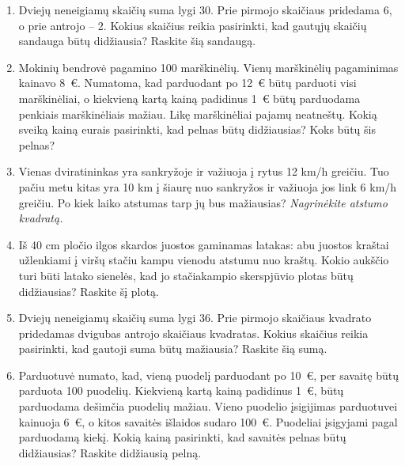 \documentclass[11pt,a4paper]{article}
\begin{document}
\begin{enumerate}[start=3]
\item \begin{minipage}[t]{\linewidth}Dviejų neneigiamų skaičių suma lygi 30. Prie pirmojo skaičiaus pridedama 6, o prie antrojo -- 2. Kokius skaičius reikia pasirinkti, kad gautųjų skaičių sandauga būtų didžiausia? Raskite šią sandaugą.\end{minipage}
\item \begin{minipage}[t]{\linewidth}Mokinių bendrovė pagamino 100 marškinėlių. Vienų marškinėlių pagaminimas kainavo 8~€. Numatoma, kad parduodant po 12~€ būtų parduoti visi marškinėliai, o kiekvieną kartą kainą padidinus 1~€ būtų parduodama penkiais marškinėliais mažiau. Likę marškinėliai pajamų neatneštų. Kokią sveiką kainą eurais pasirinkti, kad pelnas būtų didžiausias? Koks būtų šis pelnas?\end{minipage}
\item \begin{minipage}[t]{\linewidth}Vienas dviratininkas yra sankryžoje ir važiuoja į rytus 12 km/h greičiu. Tuo pačiu metu kitas yra 10 km į šiaurę nuo sankryžos ir važiuoja jos link 6 km/h greičiu. Po kiek laiko atstumas tarp jų bus mažiausias? \textit{Nagrinėkite atstumo kvadratą.}\end{minipage}
\item \begin{minipage}[t]{\linewidth}Iš 40 cm pločio ilgos skardos juostos gaminamas latakas: abu juostos kraštai užlenkiami į viršų stačiu kampu vienodu atstumu nuo kraštų. Kokio aukščio turi būti latako sienelės, kad jo stačiakampio skerspjūvio plotas būtų didžiausias? Raskite šį plotą.\end{minipage}
\item \begin{minipage}[t]{\linewidth}Dviejų neneigiamų skaičių suma lygi 36. Prie pirmojo skaičiaus kvadrato pridedamas dvigubas antrojo skaičiaus kvadratas. Kokius skaičius reikia pasirinkti, kad gautoji suma būtų mažiausia? Raskite šią sumą.\end{minipage}
\item \begin{minipage}[t]{\linewidth}Parduotuvė numato, kad, vieną puodelį parduodant po 10~€, per savaitę būtų parduota 100 puodelių. Kiekvieną kartą kainą padidinus 1~€, būtų parduodama dešimčia puodelių mažiau. Vieno puodelio įsigijimas parduotuvei kainuoja 6~€, o kitos savaitės išlaidos sudaro 100~€. Puodeliai įsigyjami pagal parduodamą kiekį. Kokią kainą pasirinkti, kad savaitės pelnas būtų didžiausias? Raskite didžiausią pelną.\end{minipage}

\end{enumerate}
\end{document}
